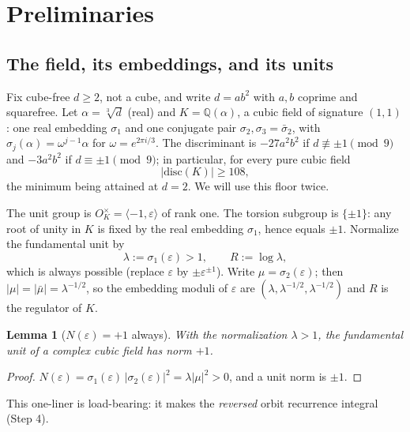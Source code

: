 \documentclass[11pt]{amsart}
\theoremstyle{plain}
\newtheorem{lemma}{Lemma}[section]
\theoremstyle{remark}
\begin{document}
\section{Preliminaries}\label{sec:prelim}

\subsection{The field, its embeddings, and its units}\label{sec:field}

Fix cube-free $d \ge 2$, not a cube, and write $d = ab^2$ with $a, b$
coprime and squarefree. Let $\alpha = \sqrt[3]{d}$ (real) and
$K = \mathbb{Q}(\alpha)$, a cubic field of signature $(1,1)$: one real
embedding $\sigma_1$ and one conjugate pair $\sigma_2, \sigma_3 =
\bar\sigma_2$, with $\sigma_j(\alpha) = \omega^{j-1}\alpha$ for
$\omega = e^{2\pi i/3}$. The discriminant is $-27a^2b^2$ if
$d \not\equiv \pm 1 \pmod 9$ and $-3a^2b^2$ if
$d \equiv \pm 1 \pmod 9$; in particular, for every pure cubic field
\[
|\mathrm{disc}(K)| \ge 108,
\]
the minimum being attained at $d = 2$. We will use this floor twice.

The unit group is $O_K^\times = \langle -1, \varepsilon\rangle$ of
rank one. The torsion subgroup is $\{\pm 1\}$: any root of unity in
$K$ is fixed by the real embedding $\sigma_1$, hence equals $\pm 1$.
Normalize the fundamental unit by
\[
\lambda := \sigma_1(\varepsilon) > 1, \qquad R := \log\lambda,
\]
which is always possible (replace $\varepsilon$ by
$\pm\varepsilon^{\pm1}$). Write $\mu = \sigma_2(\varepsilon)$; then
$|\mu| = |\bar\mu| = \lambda^{-1/2}$, so the embedding moduli of
$\varepsilon$ are $(\lambda, \lambda^{-1/2}, \lambda^{-1/2})$ and $R$
is the regulator of $K$.

\begin{lemma}[$N(\varepsilon) = +1$ always]\label{lem:normone}
With the normalization $\lambda > 1$, the fundamental unit of a
complex cubic field has norm $+1$.
\end{lemma}

\begin{proof}
$N(\varepsilon) = \sigma_1(\varepsilon)\,|\sigma_2(\varepsilon)|^2
= \lambda|\mu|^2 > 0$, and a unit norm is $\pm 1$.
\end{proof}

This one-liner is load-bearing: it makes the \emph{reversed} orbit
recurrence integral (Step 4).
\end{document}
